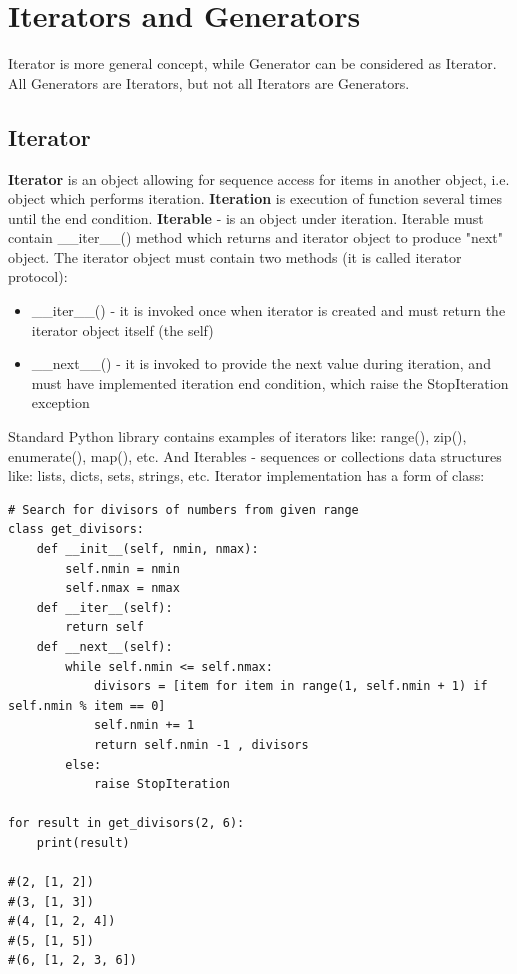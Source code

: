 \documentclass{article}
\begin{document}
\newpage
\section{Iterators and Generators}
Iterator is more general concept, while Generator can be considered as Iterator. All Generators are Iterators, but not all Iterators are Generators.

\subsection{Iterator}
\textbf{Iterator} is an object allowing for sequence access for items in another object, i.e. object which performs iteration. \textbf{Iteration} is execution of function several times until the end condition. \textbf{Iterable} - is an object under iteration. Iterable must contain \_\_iter\_\_() method which returns and iterator object to produce "next" object. The iterator object must contain two methods (it is called iterator protocol):
\begin{itemize}
\item \_\_iter\_\_() - it is invoked once when iterator is created and must return the iterator object itself (the self)
\item \_\_next\_\_() - it is invoked to provide the next value during iteration, and must have implemented iteration end condition, which raise the StopIteration exception
\end{itemize}
Standard Python library contains examples of iterators like: range(), zip(), enumerate(), map(), etc. And Iterables - sequences or collections data structures like: lists, dicts, sets, strings, etc. Iterator implementation has a form of class:
\begin{lstlisting}[style=pystyle]
# Search for divisors of numbers from given range
class get_divisors:
    def __init__(self, nmin, nmax):
        self.nmin = nmin
        self.nmax = nmax
    def __iter__(self):
        return self
    def __next__(self):
        while self.nmin <= self.nmax:
            divisors = [item for item in range(1, self.nmin + 1) if self.nmin % item == 0]
            self.nmin += 1
            return self.nmin -1 , divisors
        else:
            raise StopIteration
        
for result in get_divisors(2, 6):
    print(result)
    
#(2, [1, 2])
#(3, [1, 3])
#(4, [1, 2, 4])
#(5, [1, 5])
#(6, [1, 2, 3, 6])
\end{lstlisting}
\end{document}
